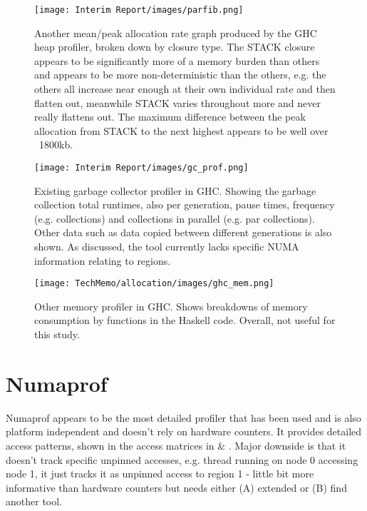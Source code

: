 \documentclass[a4paper,11pt]{article}
\begin{document}
\begin{figure}[!htb]
    \centering
    \texttt{[image: Interim Report/images/parfib.png]}
    \caption{Another mean/peak allocation rate graph produced by the GHC heap profiler, broken down by closure type. The STACK closure appears to be significantly more of a memory burden than others and appears to be more non-deterministic than the others, e.g. the others all increase near enough at their own individual rate and then flatten out, meanwhile STACK varies throughout more and never really flattens out. The maximum difference between the peak allocation from STACK to the next highest appears to be well over ~1800kb.}
    \label{fig:alloc_parfib}
\end{figure}

\begin{figure}[!htb]
    \centering
    \texttt{[image: Interim Report/images/gc\_prof.png]}
    \caption{Existing garbage collector profiler in GHC. Showing the garbage collection total runtimes, also per generation, pause times, frequency (e.g. collections) and collections in parallel (e.g. par collections). Other data such as data copied between different generations is also shown. As discussed, the tool currently lacks specific NUMA information relating to regions.}
    \label{fig:gc_prof}
\end{figure}

\begin{figure}[!htb]
    \centering
    \texttt{[image: TechMemo/allocation/images/ghc\_mem.png]}
    \caption{Other memory profiler in GHC. Shows breakdowns of memory consumption by functions in the Haskell code. Overall, not useful for this study.}
    \label{fig:ghc_mem}
\end{figure}

\section{Numaprof}

Numaprof appears to be the most detailed profiler that has been used and is also platform independent and doesn't rely on hardware counters. It provides detailed access patterns, shown in the access matrices in  \& . Major downside is that it doesn't track specific unpinned accesses, e.g. thread running on node 0 accessing node 1, it just tracks it as unpinned access to region 1 - little bit more informative than hardware counters but needs either (A) extended or (B) find another tool.
\end{document}
